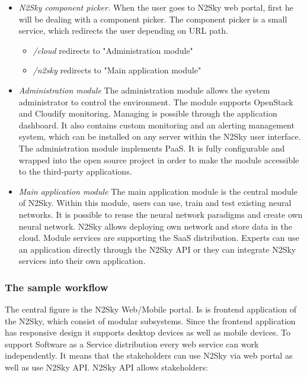\begin{itemize}
\item \emph{N2Sky component picker.} When the user goes to N2Sky web portal, first he will be dealing with a component picker. The component picker is a small service, which redirects the user depending on URL path.
\begin{itemize}
\item \emph{/cloud} redirects to "Administration module"
\item \emph{/n2sky} redirects to "Main application module"
\end{itemize}


\item \emph{Administration module} The administration module allows the system administrator to control the environment. The module supports OpenStack and Cloudify monitoring. Managing is possible through the application dashboard. It also contains custom monitoring and an alerting management system, which can be installed on any server within the N2Sky user interface. The administration module implements PaaS. It is fully configurable and wrapped into the open source project in order to make the module accessible to the third-party applications. 
\item \emph{Main application module} The main application module is the central module of N2Sky. Within this module, users can use, train and test existing neural networks. It is possible to reuse the neural network paradigms and create own neural network. N2Sky allows deploying own network and store data in the cloud. Module services are supporting the SaaS distribution. Experts can use an application directly through the N2Sky API or they can integrate N2Sky services into their own application. 
\end{itemize}


\subsubsection{The sample workflow}


The central figure is the N2Sky Web/Mobile portal. Is is frontend application of the N2Sky, which consist of modular subsystems. Since the frontend application has responsive design it supports desktop devices as well as mobile devices. 
To support Software as a Service distribution every web service can work independently. It means that the stakeholders can use N2Sky via web portal as well as use N2Sky API.
N2Sky API allows  stakeholders:

